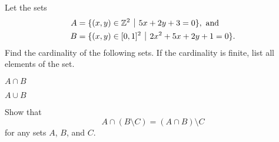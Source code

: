 \begin{problem}
    Let the sets
    \begin{align*}
        A &= \{(x,y) \in \Z^2 \vert 5x+2y+3=0\}, \text{ and}\\
        B &= \{(x,y) \in [0,1]^2 \vert 2x^2+5x+2y+1=0\}.
    \end{align*}
    Find the cardinality of the following sets. If the cardinality is finite, list all elements of the set.
    \begin{partquestions}{\alph*}
        \item $A \cap B$
        \item $A \cup B$
    \end{partquestions}
\end{problem}

\begin{problem}
    Show that
    \[
        A \cap (B \setminus C) = (A \cap B) \setminus C
    \]
    for any sets $A$, $B$, and $C$.
\end{problem}

